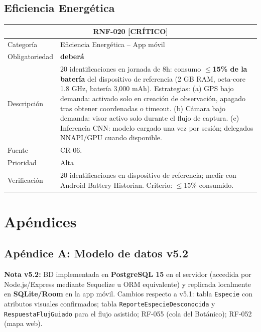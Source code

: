 \documentclass[12pt, a4paper]{article}
\newcommand{\criticomark}{\textcolor{criticolor}{\textbf{[CR\'ITICO]}}}
\begin{document}
\subsection{Eficiencia Energ\'etica}

\begin{longtable}{|p{3cm}|p{11.5cm}|}
\hline
\multicolumn{2}{|c|}{\textbf{RNF-020} \criticomark} \\
\hline
Categor\'ia & Eficiencia Energ\'etica -- App m\'ovil \\
\hline
Obligatoriedad & \textbf{deber\'a} \\
\hline
Descripci\'on & 20 identificaciones en jornada de 8h: consumo $\leq$\textbf{15\% de la bater\'ia} del dispositivo de referencia (2 GB RAM, octa-core 1.8 GHz, bater\'ia 3,000 mAh). Estrategias:\newline
(a) GPS bajo demanda: activado solo en creaci\'on de observaci\'on, apagado tras obtener coordenadas o timeout.\newline
(b) C\'amara bajo demanda: visor activo solo durante el flujo de captura.\newline
(c) Inferencia CNN: modelo cargado una vez por sesi\'on; delegados NNAPI/GPU cuando disponible. \\
\hline
Fuente & CR-06. \\
\hline
Prioridad & Alta \\
\hline
Verificaci\'on & 20 identificaciones en dispositivo de referencia; medir con Android Battery Historian. Criterio: $\leq$15\% consumido. \\
\hline
\end{longtable}

\section{Ap\'endices}

\subsection{Ap\'endice A: Modelo de datos v5.2}

\textbf{Nota v5.2:} BD implementada en \textbf{PostgreSQL 15} en el servidor (accedida por Node.js/Express mediante Sequelize u ORM equivalente) y replicada localmente en \textbf{SQLite/Room} en la app m\'ovil. Cambios respecto a v5.1: tabla \texttt{Especie} con atributos visuales confirmados; tabla \texttt{ReporteEspecieDesconocida} y \texttt{RespuestaFlujGuiado} para el flujo asistido; RF-055 (cola del Bot\'anico); RF-052 (mapa web).
\end{document}
